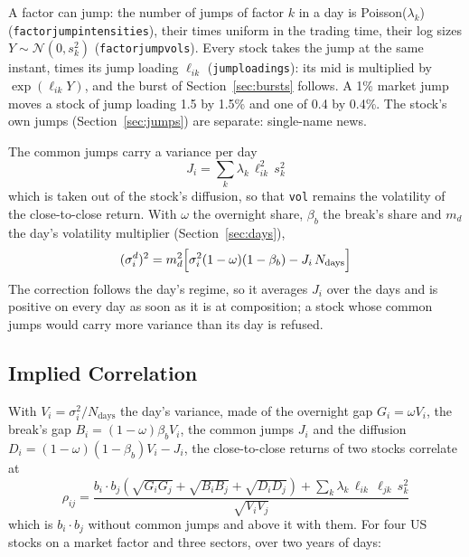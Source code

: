 \documentclass[11pt,a4paper]{article}
\newcommand{\key}[1]{\texttt{#1}}
\theoremstyle{paper}
\begin{document}
{\sloppy A factor can jump: the number of jumps of factor $k$ in a day is Poisson($\lambda_k$) (\key{factorjumpintensities}), their times uniform in the trading time, their log sizes $Y\sim\mathcal N(0,s_k^2)$ (\key{factorjumpvols}). Every stock takes the jump at the same instant, times its jump loading $\ell_{ik}$ (\key{jumploadings}): its mid is multiplied by $\exp(\ell_{ik}Y)$, and the burst of Section~\ref{sec:bursts} follows. A 1\% market jump moves a stock of jump loading 1.5 by 1.5\% and one of 0.4 by 0.4\%. The stock's own jumps (Section~\ref{sec:jumps}) are separate: single-name news.\par}

The common jumps carry a variance per day
\begin{equation}
J_i=\sum_k\lambda_k\,\ell_{ik}^2\,s_k^2
\end{equation}
which is taken out of the stock's diffusion, so that \key{vol} remains the volatility of the close-to-close return. With $\omega$ the overnight share, $\beta_b$ the break's share and $m_d$ the day's volatility multiplier (Section~\ref{sec:days}),
\begin{equation}
(\sigma_i^{d})^2=m_d^2\Bigl[\sigma_i^2(1-\omega)(1-\beta_b)-J_i\,N_{\text{days}}\Bigr]
\end{equation}
The correction follows the day's regime, so it averages $J_i$ over the days and is positive on every day as soon as it is at composition; a stock whose common jumps would carry more variance than its day is refused.

\subsection{Implied Correlation}

With $V_i=\sigma_i^2/N_{\text{days}}$ the day's variance, made of the overnight gap $G_i=\omega V_i$, the break's gap $B_i=(1-\omega)\beta_bV_i$, the common jumps $J_i$ and the diffusion $D_i=(1-\omega)(1-\beta_b)V_i-J_i$, the close-to-close returns of two stocks correlate at
\begin{equation}
\rho_{ij}=\frac{b_i\cdot b_j\left(\sqrt{G_iG_j}+\sqrt{B_iB_j}+\sqrt{D_iD_j}\right)+\sum_k\lambda_k\,\ell_{ik}\,\ell_{jk}\,s_k^2}{\sqrt{V_iV_j}}
\end{equation}
which is $b_i\cdot b_j$ without common jumps and above it with them. For four US stocks on a market factor and three sectors, over two years of days:
\end{document}
